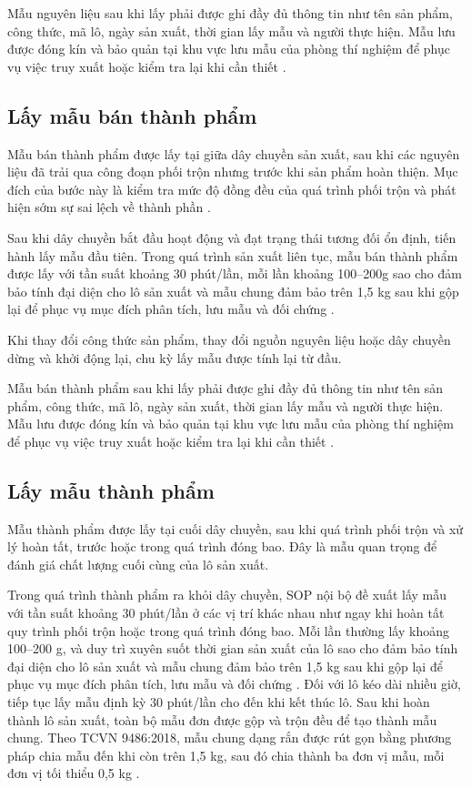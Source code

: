 Mẫu nguyên liệu sau khi lấy phải được ghi đầy đủ thông tin như tên sản phẩm, công thức, mã lô, ngày sản xuất, thời gian lấy mẫu và người thực hiện. 
Mẫu lưu được đóng kín và bảo quản tại khu vực lưu mẫu của phòng thí nghiệm để phục vụ việc truy xuất hoặc kiểm tra lại khi cần thiết \cite{company-internal-documents}.



\subsection{Lấy mẫu bán thành phẩm}
Mẫu bán thành phẩm được lấy tại giữa dây chuyền sản xuất, sau khi các nguyên liệu đã trải qua công đoạn phối trộn nhưng trước khi sản phẩm hoàn thiện. 
Mục đích của bước này là kiểm tra mức độ đồng đều của quá trình phối trộn và phát hiện sớm sự sai lệch về thành phần \cite{company-internal-documents}.

Sau khi dây chuyền bắt đầu hoạt động và đạt trạng thái tương đối ổn định, tiến hành lấy mẫu đầu tiên. 
Trong quá trình sản xuất liên tục, mẫu bán thành phẩm được lấy với tần suất khoảng 30 phút/lần, mỗi lần khoảng 100--200g sao cho đảm bảo tính đại diện cho lô sản xuất và mẫu chung đảm bảo trên 1,5 kg sau khi gộp lại để phục vụ mục đích phân tích, lưu mẫu và đối chứng \cite{company-internal-documents}.

Khi thay đổi công thức sản phẩm, thay đổi nguồn nguyên liệu hoặc dây chuyền dừng và khởi động lại, chu kỳ lấy mẫu được tính lại từ đầu. 

Mẫu bán thành phẩm sau khi lấy phải được ghi đầy đủ thông tin như tên sản phẩm, công thức, mã lô, ngày sản xuất, thời gian lấy mẫu và người thực hiện. 
Mẫu lưu được đóng kín và bảo quản tại khu vực lưu mẫu của phòng thí nghiệm để phục vụ việc truy xuất hoặc kiểm tra lại khi cần thiết \cite{company-internal-documents}.

\subsection{Lấy mẫu thành phẩm}
Mẫu thành phẩm được lấy tại cuối dây chuyền, sau khi quá trình phối trộn và xử lý hoàn tất, trước hoặc trong quá trình đóng bao. 
Đây là mẫu quan trọng để đánh giá chất lượng cuối cùng của lô sản xuất. 

Trong quá trình thành phẩm ra khỏi dây chuyền, SOP nội bộ đề xuất lấy mẫu với tần suất khoảng 30 phút/lần ở các vị trí khác nhau như ngay khi hoàn tất quy trình phối trộn hoặc trong quá trình đóng bao. 
Mỗi lần thường lấy khoảng 100--200 g, và duy trì xuyên suốt thời gian sản xuất của lô sao cho đảm bảo tính đại diện cho lô sản xuất và mẫu chung đảm bảo trên 1,5 kg sau khi gộp lại để phục vụ mục đích phân tích, lưu mẫu và đối chứng \cite{company-internal-documents}.
Đối với lô kéo dài nhiều giờ, tiếp tục lấy mẫu định kỳ 30 phút/lần cho đến khi kết thúc lô. Sau khi hoàn thành lô sản xuất, toàn bộ mẫu đơn được gộp và trộn đều để tạo thành mẫu chung. Theo TCVN 9486:2018, mẫu chung dạng rắn được rút gọn bằng phương pháp chia mẫu đến khi còn trên 1,5 kg, sau đó chia thành ba đơn vị mẫu, mỗi đơn vị tối thiểu 0,5 kg \cite{tcvn9486-sampling}.

